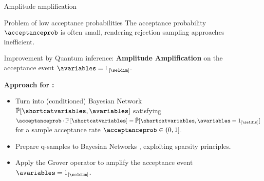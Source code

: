\documentclass{beamer}
\begin{document}
    \begin{frame}{Amplitude amplification}

        \begin{block}{Problem of low acceptance probabilities}
            The acceptance probability $\acceptanceprob$ is often small, rendering rejection sampling approaches inefficient.
        \end{block}

        Improvement by Quantum inference: {\bf Amplitude Amplification} on the acceptance event $\avariables=\onetuple{[\seldim]}$.

            {\bf Approach for \CompActNets{}:}
        \begin{itemize}
            \item Turn \CompActNets{} into (conditioned) Bayesian Network $\secprobat{\shortcatvariables,\avariables}$ satisfying $\acceptanceprob \cdot \probwith
            = \secprobat{\shortcatvariables,\avariables=1_{[\seldim]}}$ for a sample acceptance rate $\acceptanceprob\in(0,1]$.
            \item Prepare q-samples to Bayesian Networks \cite{low_quantum_2014}, exploiting sparsity principles.
            \item Apply the Grover operator to amplify the acceptance event $\avariables=\onetuple{[\seldim]}$.
        \end{itemize}


    \end{frame}


\end{document}
